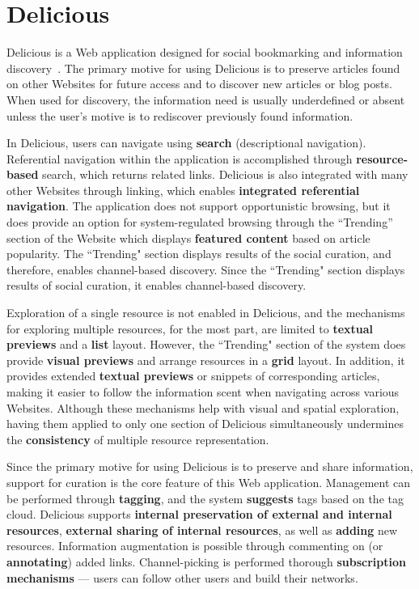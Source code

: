 {\section{Delicious}
Delicious is a Web application designed for social bookmarking and information discovery~\cite{rader2008influences, tesconi2008semantify}. The primary motive for using Delicious is to preserve articles found on other Websites for future access and to discover new articles or blog posts. When used for discovery, the information need is usually underdefined or absent unless the user's motive is to rediscover previously found information.   

In Delicious, users can navigate using \textbf{search} (descriptional navigation). Referential navigation within the application is accomplished through \textbf{resource-based} search, which returns related links. Delicious is also integrated with many other Websites through linking, which enables \textbf{integrated referential navigation}. The application does not support opportunistic browsing, but it does provide an option for system-regulated browsing through the ``Trending'' section of the Website which displays \textbf{featured content} based on article popularity. The ``Trending" section displays results of the social curation, and therefore, enables channel-based discovery. Since the ``Trending" section displays results of social curation, it enables channel-based discovery.

Exploration of a single resource is not enabled in Delicious, and the mechanisms for exploring multiple resources, for the most part, are limited to \textbf{textual previews} and a \textbf{list} layout. However, the ``Trending" section of the system does provide \textbf{visual previews} and arrange resources in a \textbf{grid} layout. In addition, it provides extended \textbf{textual previews} or snippets of corresponding articles, making it easier to follow the information scent when navigating across various Websites. Although these mechanisms help with visual and spatial exploration, having them applied to only one section of Delicious simultaneously undermines the \textbf{consistency} of multiple resource representation. 

Since the primary motive for using Delicious is to preserve and share information, support for curation is the core feature of this Web application. Management can be performed through \textbf{tagging}, and the system \textbf{suggests} tags based on the tag cloud. Delicious supports \textbf{internal preservation of external and internal resources}, \textbf{external sharing of internal resources}, as well as \textbf{adding} new resources. Information augmentation is possible through commenting on (or \textbf{annotating}) added links. Channel-picking is performed thorough \textbf{subscription mechanisms} --- users can follow other users and build their networks. 

}
